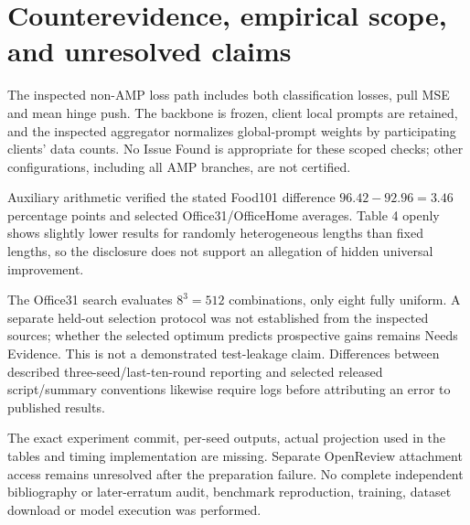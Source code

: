 \documentclass[10pt]{article}
\begin{document}
\section*{Counterevidence, empirical scope, and unresolved claims}
The inspected non-AMP loss path includes both classification losses, pull MSE and mean hinge push. The backbone is frozen, client local prompts are retained, and the inspected aggregator normalizes global-prompt weights by participating clients’ data counts. No Issue Found is appropriate for these scoped checks; other configurations, including all AMP branches, are not certified.\par
Auxiliary arithmetic verified the stated Food101 difference \(96.42-92.96=3.46\) percentage points and selected Office31/OfficeHome averages. Table 4 openly shows slightly lower results for randomly heterogeneous lengths than fixed lengths, so the disclosure does not support an allegation of hidden universal improvement.\par
The Office31 search evaluates \(8^3=512\) combinations, only eight fully uniform. A separate held-out selection protocol was not established from the inspected sources; whether the selected optimum predicts prospective gains remains Needs Evidence. This is not a demonstrated test-leakage claim. Differences between described three-seed/last-ten-round reporting and selected released script/summary conventions likewise require logs before attributing an error to published results.\par
The exact experiment commit, per-seed outputs, actual projection used in the tables and timing implementation are missing. Separate OpenReview attachment access remains unresolved after the preparation failure. No complete independent bibliography or later-erratum audit, benchmark reproduction, training, dataset download or model execution was performed.\par
\end{document}
